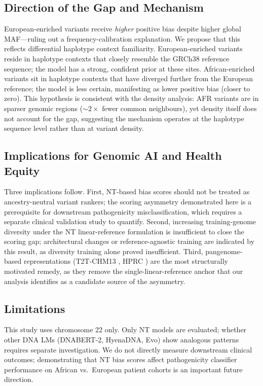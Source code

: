 \documentclass[conference]{IEEEtran}
\begin{document}
\subsection{Direction of the Gap and Mechanism}

European-enriched variants receive \emph{higher} positive bias despite higher
global MAF---ruling out a frequency-calibration explanation. We propose that this
reflects differential haplotype context familiarity. European-enriched variants
reside in haplotype contexts that closely resemble the GRCh38 reference sequence;
the model has a strong, confident prior at these sites. African-enriched variants
sit in haplotype contexts that have diverged further from the European reference;
the model is less certain, manifesting as lower positive bias (closer to zero).
This hypothesis is consistent with the density analysis: AFR variants are in
sparser genomic regions (${\sim}2\times$ fewer common neighbours), yet density
itself does not account for the gap, suggesting the mechanism operates at the
haplotype sequence level rather than at variant density.

\subsection{Implications for Genomic AI and Health Equity}

Three implications follow. First, NT-based bias scores should not be treated as
ancestry-neutral variant rankers; the scoring asymmetry demonstrated here
is a prerequisite for downstream pathogenicity misclassification, which
requires a separate clinical validation study to quantify. Second, increasing
training-genome diversity under the NT linear-reference formulation is
insufficient to close the scoring gap; architectural changes or
reference-agnostic training are indicated by this result, as diversity training
alone proved insufficient.
Third, pangenome-based representations (T2T-CHM13 \cite{t2t},
HPRC \cite{pangenome}) are the most structurally motivated remedy, as they
remove the single-linear-reference anchor that our analysis identifies as a
candidate source of the asymmetry.

\subsection{Limitations}
\label{sec:limitations}

This study uses chromosome 22 only. Only NT models are evaluated; whether other
DNA LMs (DNABERT-2, HyenaDNA, Evo) show analogous patterns requires separate
investigation. We do not directly measure downstream clinical outcomes;
demonstrating that NT bias scores affect pathogenicity classifier performance
on African vs.\ European patient cohorts is an important future direction.
\end{document}
